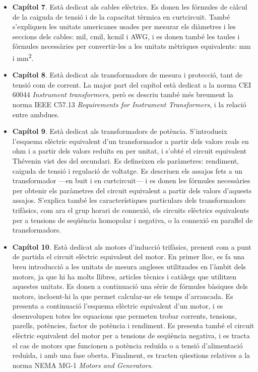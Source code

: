 \begin{itemize}
\begin{itemize}
			\item \textbf{Capítol 7}. Està dedicat als cables elèctrics. Es donen les fórmules de càlcul de la caiguda de tensió i de la capacitat tèrmica en curtcircuit. També s'expliquen  les unitats americanes usades per mesurar els diàmetres i les seccions dels cables: mil, cmil, kcmil i AWG, i es donen també les taules i fórmules necessàries per convertir-les a les  unitats mètriques equivalents: mm i \unit{mm^2}.
			\item \textbf{Capítol 8}. Està dedicat als transformadors de mesura i protecció, tant de tensió com de corrent. La major part del capítol està dedicat a la norma CEI 60044 \textit{Instrument transformers}, però es descriu també més breument  la norma IEEE C57.13 	\textit{	Requirements for Instrument Transformers}, i la relació entre ambdues.
			\item \textbf{Capítol 9}. Està dedicat als transformadors de potència. S'introdueix l'esquema elèctric equivalent d'un transformador a partir dels valors reals en  ohm i a partir dels valors reduïts en per unitat, i s'obté el circuit equivalent Thévenin vist des del secundari. Es defineixen els paràmetres: rendiment,  caiguda de tensió i regulació de voltatge. Es descriuen els assajos fets a un transformador  ---en buit i en curtcircuit--- i es donen les fórmules necessàries per obtenir els paràmetres del circuit equivalent a partir dels valors d'aquests assajos. S'explica també les característiques particulars dels transformadors trifàsics, com ara el grup horari de connexió,  els circuits elèctrics equivalents per a tensions de seqüència  homopolar i  negativa, o la connexió en paraŀlel de transformadors.
			\item \textbf{Capítol 10}. Està dedicat als motors d'inducció trifàsics, prenent com a punt de partida el circuit elèctric equivalent del motor. En primer lloc, es fa una breu introducció  a les unitats de mesura angleses utilitzades en l'àmbit dels motors, ja que hi ha molts llibres, articles tècnics i catàlegs que utilitzen aquestes unitats. Es donen a continuació una sèrie de fórmules bàsiques dels motors, incloent-hi la que permet calcular-ne els temps d'arrancada. Es presenta a continuació l'esquema elèctric equivalent d'un motor, i es desenvolupen totes les equacions que permeten trobar   corrents, tensions, parells, potències, factor de potència i rendiment. Es presenta també el circuit elèctric equivalent del motor per a tensions 
			de seqüència negativa, i es tracta el cas de motors que funcionen a potència reduïda o a tensió d'alimentació reduïda, i amb una fase oberta. Finalment,  es tracten qüestions relatives a la norma NEMA MG-1 \textit{Motors and Generators}. 

\end{itemize}
\end{itemize}
